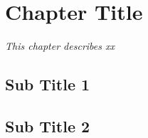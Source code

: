 \chapter{Chapter Title}
\label{chap6}
\textit{This chapter describes xx }
\vspace{2ex}\vfill
\minitoc
\newpage

\section{Sub Title 1}
\section{Sub Title 2}



